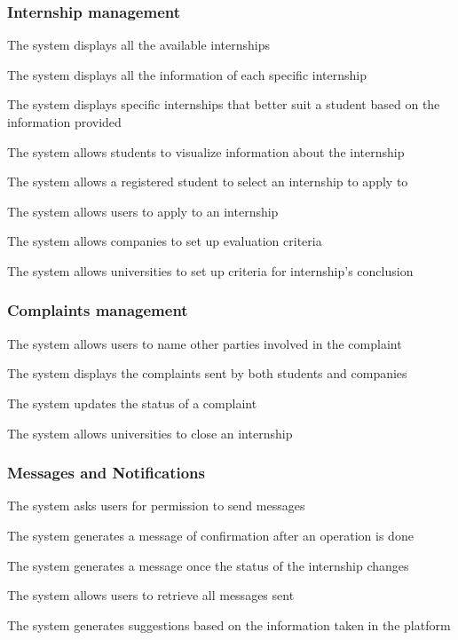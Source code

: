 \subsubsection*{Internship management}
\begin{enumerate}[label={\textbf{[R\arabic*]}}, leftmargin=1.35cm]
    \setcounter{enumi}{12}
    \item The system displays all the available internships 
    \item The system displays all the information of each specific internship
    \item The system displays specific internships that better suit a student based on the information provided
    \item The system allows students to visualize information about the internship
    \item The system allows a registered student to select an internship to apply to
    \item The system allows users to apply to an internship
    \item The system allows companies to set up evaluation criteria
    \item The system allows universities to set up criteria for internship's conclusion
\end{enumerate}

\subsubsection*{Complaints management}
\begin{enumerate}[label={\textbf{[R\arabic*]}}, leftmargin=1.35cm]
    \setcounter{enumi}{20}
    \item The system allows users to name other parties involved in the complaint
    \item The system displays the complaints sent by both students and companies
    \item The system updates the status of a complaint
    \item The system allows universities to close an internship
\end{enumerate}

\subsubsection*{Messages and Notifications}
\begin{enumerate}[label={\textbf{[R\arabic*]}}, leftmargin=1.35cm]
    \setcounter{enumi}{24}
    \item The system asks users for permission to send messages
    \item The system generates a message of confirmation after an operation is done
    \item The system generates a message once the status of the internship changes
    \item The system allows users to retrieve all messages sent
    \item The system generates suggestions based on the information taken in the platform
\end{enumerate}

